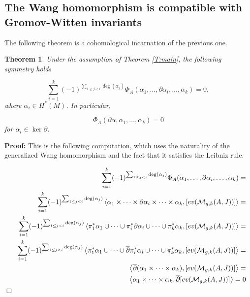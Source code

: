 \documentclass[a4paper,14pt]{article}
\newcommand{\C}[1]{{\cal #1}}
\newcommand{\al}{{\alpha}}
\newcommand{\pf}{\NI {\bf Proof: }}
\newcommand{\QED}{\hfill$\Box$\medskip}
\newcommand{\NI}{{\noindent}}
\newtheorem{thm}[theorem]{Theorem}
\numberwithin{equation}{section}
\begin{document}
\subsection{The Wang homomorphism is compatible with Gromov-Witten
invariants}


The following theorem is a cohomological incarnation of
the previous one.




\begin{thm}\label{T:maincoho}
Under the assumption of Theorem \ref{T:main}, the following
symmetry holds

$$\sum _{i=1}^k (-1)^{\sum _{1\leq j < i}\deg (\al_j)} 
\Phi _A 
(\al _1, \dots ,\partial \al_i, \dots ,\al_k)=0, $$
where $\al_i\in H^*(M)$. In particular,

$$\Phi_A (\partial \al, \al_1,\dots ,\al_k)=0$$
for $\al_i\in \ker \partial$.
\end{thm}



\pf This is the following computation, which uses the 
naturality of the generalized Wang homomorphism and the fact that
it satisfies the Leibniz rule.

\begin{eqnarray*}
&&\sum _{i=1}^k (-1)^{\sum _{1\leq j < i}\deg (\al_j)} 
\Phi_A 
(\al _1, \dots ,\partial \al_i, \dots , \al_k)=\\
%
%
&&
\sum _{i=1}^k (-1)^{\sum _{1\leq j < i}\deg (\al_j)} 
\left <
\al _1 \times \dots \times \partial \al_i\times \dots \times \al_k,
[ev(\C M_{g,k}(A,J))]\right >=\\
%
%
&&
\sum _{i=1}^k (-1)^{\sum _{1\leq j < i}\deg (\al_j)} 
\left <
\pi _1^*\al _1 \cup \dots \cup \pi _i^* \partial \al_i\cup \dots \cup \pi _k^* \al_k,
[ev(\C M_{g,k}(A,J))]\right >=\\
%
%
&&
\sum _{i=1}^k (-1)^{\sum _{1\leq j < i}\deg (\al_j)} 
\left <
\pi _1^*\al _1 \cup \dots \cup 
\overline {\partial }\pi _i^* \al_i\cup \dots \cup \pi _k^* \al_k,
[ev(\C M_{g,k}(A,J))]\right >=\\
%
%
%
%
&&\left <\overline{\partial } (\al_1\times \dots \times \al_k),
[ev(\C M_{g,k}(A,J))]\right >=\\
%
%
&&\left <\al_1\times \dots \times \al_k,
\overline {\partial } [ev(\C M_{g,k}(A,J))]\right >=0
\end{eqnarray*}
\QED
\end{document}
